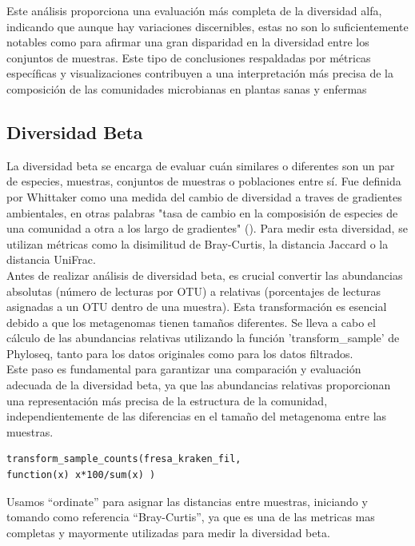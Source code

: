 Este análisis proporciona una evaluación más completa de la diversidad alfa, indicando que aunque hay variaciones discernibles, estas no son lo suficientemente notables como para afirmar una gran disparidad en la diversidad entre los conjuntos de muestras. Este tipo de conclusiones respaldadas por métricas específicas y visualizaciones contribuyen a una interpretación más precisa de la composición de las comunidades microbianas en plantas sanas y enfermas\\

\subsection{Diversidad Beta}
La diversidad beta se encarga de evaluar cuán similares o diferentes son un par de especies, muestras, conjuntos de muestras o poblaciones entre sí. Fue definida por Whittaker como una medida del cambio de diversidad a traves de gradientes ambientales, en otras palabras "tasa de cambio en la composisión de especies de una comunidad a otra a los largo de gradientes" (\cite{whittaker1960}). Para medir esta diversidad, se utilizan métricas como la disimilitud de Bray-Curtis, la distancia Jaccard o la distancia UniFrac.\\

Antes de realizar análisis de diversidad beta, es crucial convertir las abundancias absolutas (número de lecturas por OTU) a relativas (porcentajes de lecturas asignadas a un OTU dentro de una muestra). Esta transformación es esencial debido a que los metagenomas tienen tamaños diferentes. Se lleva a cabo el cálculo de las abundancias relativas utilizando la función 'transform\_sample' de Phyloseq, tanto para los datos originales como para los datos filtrados.\\

Este paso es fundamental para garantizar una comparación y evaluación adecuada de la diversidad beta, ya que las abundancias relativas proporcionan una representación más precisa de la estructura de la comunidad, independientemente de las diferencias en el tamaño del metagenoma entre las muestras.\\

\begin{lstlisting}[basicstyle=\small] 
transform_sample_counts(fresa_kraken_fil,
function(x) x*100/sum(x) )
\end{lstlisting}

Usamos “ordinate” para asignar las distancias entre muestras, iniciando y tomando como referencia “Bray-Curtis”, ya que es una de las
metricas mas completas y mayormente utilizadas para medir la diversidad beta.\\

